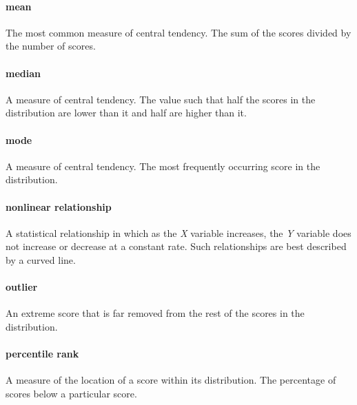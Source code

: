 \documentclass[
]{krantz}
\begin{document}
\paragraph*{mean}\label{mean}

The most common measure of central tendency. The sum of the scores divided by the number of scores.

\paragraph*{median}\label{median}

A measure of central tendency. The value such that half the scores in the distribution are lower than it and half are higher than it.

\paragraph*{mode}\label{mode}

A measure of central tendency. The most frequently occurring score in the distribution.

\paragraph*{nonlinear relationship}\label{nonlinear-relationship}

A statistical relationship in which as the \emph{X} variable increases, the \emph{Y} variable does not increase or decrease at a constant rate. Such relationships are best described by a curved line.

\paragraph*{outlier}\label{outlier}

An extreme score that is far removed from the rest of the scores in the distribution.

\paragraph*{percentile rank}\label{percentile-rank}

A measure of the location of a score within its distribution. The percentage of scores below a particular score.
\end{document}

